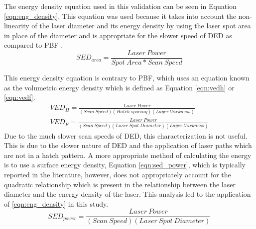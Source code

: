 \documentclass[pdflatex,sn-mathphys]{sn-jnl}
\begin{document}
	The energy density equation used in this validation can be seen in Equation \ref{eqn:eng_density}.  This equation was used because it takes into account the non-linearity of the laser diameter and its energy density by using the laser spot area in place of the diameter and is appropriate for the slower speed of \ac{DED} as compared to \ac{PBF} \cite{kurzynowskiEffectScanningSupport2019}.
	\begin{equation}
		SED_{area} = \frac{Laser\ Power}{Spot\ Area * Scan\ Speed} \label{eqn:eng_density}
	\end{equation}
	
	This energy density equation is contrary to \ac{PBF}, which uses an equation known as the volumetric energy density which is defined as Equation \ref{eqn:vedh} or \ref{eqn:vedf}.
	\begin{align}
		VED_H = \frac{Laser\ Power}{(Scan\ Speed)  (Hatch\ spacing)  (Layer\ thickness)} \label{eqn:vedh}\\
		VED_F = \frac{Laser\ Power}{(Scan\ Speed) (Laser\ Spot\ Diameter) (Layer\ thickness)} \label{eqn:vedf}
	\end{align}
	Due to the much slower scan speeds of \ac{DED}, this characterization is not useful.  This is due to the slower nature of \ac{DED} and the application of laser paths which are not in a hatch pattern.  A more appropriate method of calculating the energy is to use a surface energy density,  
	Equation \ref{eqn:sed_power}, which is typically reported in the literature, however, does not appropriately account for the quadratic relationship which is present in the relationship between the laser diameter and the energy density of the laser.  This analysis led to the application of \ref{eqn:eng_density} in this study.
	\begin{equation}
		SED_{power} = \frac{Laser\ Power}{(Scan\ Speed) (Laser\ Spot\ Diameter)} \label{eqn:sed_power}
	\end{equation}
	
\end{document}
